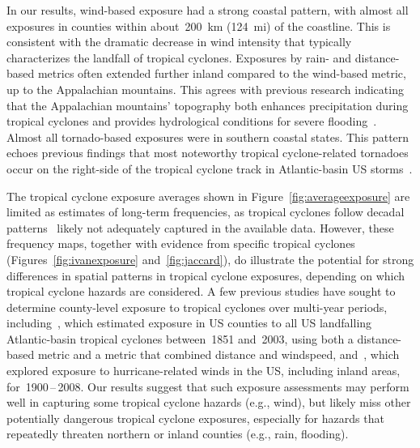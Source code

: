 In our results, wind-based exposure had a strong coastal pattern, with almost
all exposures in counties within about~200~\si{\kilo\metre} (124~mi) of the
coastline. This is consistent with the dramatic decrease in wind intensity that
typically characterizes the landfall of tropical cyclones. Exposures by rain-
and distance-based metrics often extended further inland compared to the
wind-based metric, up to the Appalachian mountains. This agrees with previous
research indicating that the Appalachian mountains' topography both enhances
precipitation during tropical cyclones and provides hydrological conditions for
severe flooding~\citep{rees2001}.  Almost all tornado-based exposures were in
southern coastal states. This pattern echoes previous findings that most
noteworthy tropical cyclone-related tornadoes occur on the right-side of the
tropical cyclone track in Atlantic-basin \ac{US} storms~\citep{moore2012}.

The tropical cyclone exposure averages shown in
Figure~\ref{fig:averageexposure} are limited as estimates of long-term
frequencies, as tropical cyclones follow decadal
patterns~\citep{kossin2007more} likely not adequately captured in the available
data.  However, these frequency maps, together with evidence from specific
tropical cyclones (Figures~\ref{fig:ivanexposure} and~\ref{fig:jaccard}),  do
illustrate the potential for strong differences in spatial patterns in tropical
cyclone exposures, depending on which tropical cyclone hazards are considered.
A few previous studies have sought to determine county-level exposure to
tropical cyclones over multi-year periods, including~\citet{zandbergen2009},
which estimated exposure in \ac{US} counties to all \ac{US} landfalling
Atlantic-basin tropical cyclones between~1851 and~2003, using both a
distance-based metric and a metric that combined distance and windspeed,
and~\citet{kruk2010}, which explored exposure to hurricane-related winds in the
\ac{US}, including inland areas, for~1900\,--\,2008.  Our results suggest that
such exposure assessments may perform well in capturing some tropical cyclone
hazards (e.g., wind), but likely miss other potentially dangerous tropical
cyclone exposures, especially for hazards that repeatedly threaten northern or
inland counties (e.g., rain, flooding).

